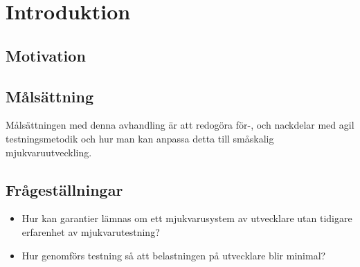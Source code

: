 

\chapter{Introduktion}
\label{cha:introduction}



\section{Motivation}
\label{sec:motivation}






\section{Målsättning}
\label{sec:aim}
Målsättningen med denna avhandling är att redogöra för-, och nackdelar med agil testningsmetodik och hur man kan anpassa detta till småskalig mjukvaruutveckling.



\section{Frågeställningar}
\label{sec:research-questions}
\begin{itemize}
\item Hur kan garantier lämnas om ett mjukvarusystem av utvecklare utan tidigare erfarenhet av mjukvarutestning?
\item Hur genomförs testning så att belastningen på utvecklare blir minimal? 
\end{itemize}

